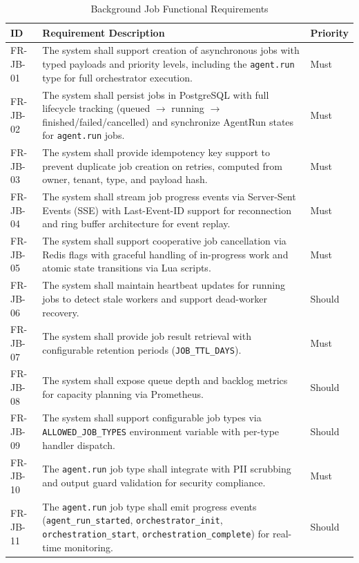 \documentclass[a4paper,twoside]{sapthesis}
\begin{document}
\begin{table}[htbp]
\centering
\caption{Background Job Functional Requirements}
\label{tab:fr-jobs}
\small
\begin{tabularx}{\textwidth}{|l|X|l|}
\hline
\textbf{ID} & \textbf{Requirement Description} & \textbf{Priority} \\
\midrule
FR-JB-01 & The system shall support creation of asynchronous jobs with typed payloads and priority levels, including the \texttt{agent.run} type for full orchestrator execution. & Must \\
\midrule
FR-JB-02 & The system shall persist jobs in PostgreSQL with full lifecycle tracking (queued $\rightarrow$ running $\rightarrow$ finished/failed/cancelled) and synchronize AgentRun states for \texttt{agent.run} jobs. & Must \\
\midrule
FR-JB-03 & The system shall provide idempotency key support to prevent duplicate job creation on retries, computed from owner, tenant, type, and payload hash. & Must \\
\midrule
FR-JB-04 & The system shall stream job progress events via Server-Sent Events (SSE) with Last-Event-ID support for reconnection and ring buffer architecture for event replay. & Must \\
\midrule
FR-JB-05 & The system shall support cooperative job cancellation via Redis flags with graceful handling of in-progress work and atomic state transitions via Lua scripts. & Must \\
\midrule
FR-JB-06 & The system shall maintain heartbeat updates for running jobs to detect stale workers and support dead-worker recovery. & Should \\
\midrule
FR-JB-07 & The system shall provide job result retrieval with configurable retention periods (\texttt{JOB\_TTL\_DAYS}). & Must \\
\midrule
FR-JB-08 & The system shall expose queue depth and backlog metrics for capacity planning via Prometheus. & Should \\
\midrule
FR-JB-09 & The system shall support configurable job types via \texttt{ALLOWED\_JOB\_TYPES} environment variable with per-type handler dispatch. & Should \\
\midrule
FR-JB-10 & The \texttt{agent.run} job type shall integrate with PII scrubbing and output guard validation for security compliance. & Must \\
\midrule
FR-JB-11 & The \texttt{agent.run} job type shall emit progress events (\texttt{agent\_run\_started}, \texttt{orchestrator\_init}, \texttt{orchestration\_start}, \texttt{orchestration\_complete}) for real-time monitoring. & Should \\
\midrule
\end{tabularx}
\end{table}
\end{document}
